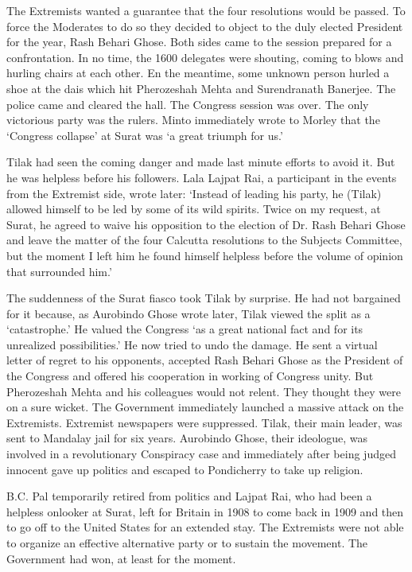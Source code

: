 The Extremists wanted a guarantee that the four resolutions would be passed. To force the Moderates to do so they decided to object to the duly elected President for the year, Rash Behari Ghose. Both sides came to the session prepared for a confrontation. In no time, the 1600 delegates were shouting, coming to blows and hurling chairs at each other. En the meantime, some unknown person hurled a shoe at the dais which hit Pherozeshah Mehta and Surendranath Banerjee. The police came and cleared the hall. The Congress session was over. The only victorious party was the rulers. Minto immediately wrote to Morley that the `Congress collapse' at Surat was `a great triumph for us.'

Tilak had seen the coming danger and made last minute efforts to avoid it. But he was helpless before his followers. Lala Lajpat Rai, a participant in the events from the Extremist side, wrote later: `Instead of leading his party, he (Tilak) allowed himself to be led by some of its wild spirits. Twice on my request, at Surat, he agreed to waive his opposition to the election of Dr. Rash Behari Ghose and leave the matter of the four Calcutta resolutions to the Subjects Committee, but the moment I left him he found himself helpless before the volume of opinion that surrounded him.'

The suddenness of the Surat fiasco took Tilak by surprise. He had not bargained for it because, as Aurobindo Ghose wrote later, Tilak viewed the split as a `catastrophe.' He valued the Congress `as a great national fact and for its unrealized possibilities.' He now tried to undo the damage. He sent a virtual letter of regret to his opponents, accepted Rash Behari Ghose as the President of the Congress and offered his cooperation in working of Congress unity. But Pherozeshah Mehta and his colleagues would not relent. They thought they were on a sure wicket. The Government immediately launched a massive attack on the Extremists. Extremist newspapers were suppressed. Tilak, their main leader, was sent to Mandalay jail for six years. Aurobindo Ghose, their ideologue, was involved in a revolutionary Conspiracy case and immediately after being judged innocent gave up politics and escaped to Pondicherry to take up religion.

B.C. Pal temporarily retired from politics and Lajpat Rai, who had been a helpless onlooker at Surat, left for Britain in 1908 to come back in 1909 and then to go off to the United States for an extended stay. The Extremists were not able to organize an effective alternative party or to sustain the movement. The Government had won, at least for the moment.

